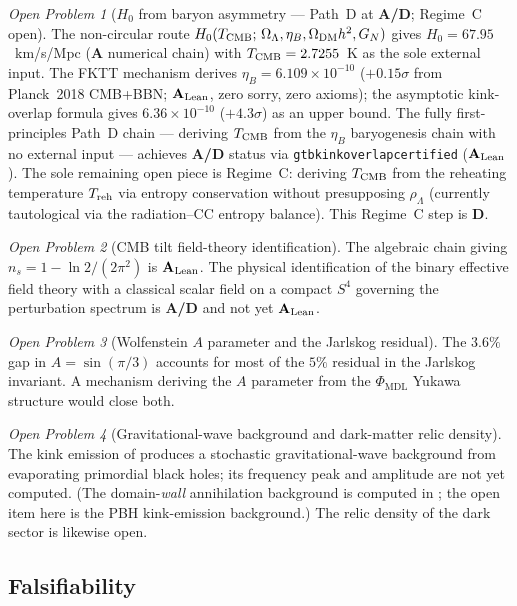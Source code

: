 \documentclass[11pt]{article}
\theoremstyle{remark}
\newtheorem{openprob}{Open Problem}
\newcommand{\PHIMDL}{\Phi_{\mathrm{MDL}}}
\newcommand{\lean}[1]{%
  \penalty-100
  \begingroup\def\_{\textunderscore\allowbreak}\texttt{#1}\endgroup}
\newcommand{\Hnought}{H_0}
\newcommand{\ns}{n_s}
\newcommand{\CatA}{\textbf{A}}
\newcommand{\CatAL}{\ensuremath{\textbf{A}_{\rm Lean}}}
\newcommand{\CatAD}{\textbf{A/D}}
\newcommand{\CatD}{\textbf{D}}
\begin{document}
\begin{openprob}[$\Hnought$ from baryon asymmetry --- Path~D at \CatAD{}; Regime~C open]
The non-circular route $H_0(T_{\rm CMB};\,\Omega_\Lambda, \eta_B, \Omega_{\rm DM}h^2, G_N)$
gives $H_0 = 67.95$~km/s/Mpc (\CatA{} numerical chain) with $T_{\rm CMB} = 2.7255$~K as
the sole external input. The FKTT mechanism derives $\eta_B = 6.109\times10^{-10}$
($+0.15\sigma$ from Planck~2018 CMB+BBN; \CatAL{}, zero sorry, zero axioms); the
asymptotic kink-overlap formula gives $6.36\times10^{-10}$ ($+4.3\sigma$) as an upper bound.
The fully first-principles Path~D chain --- deriving $T_{\rm CMB}$ from the $\eta_B$
baryogenesis chain with no external input --- achieves \CatAD{} status via
\lean{gtb\_kink\_overlap\_certified} (\CatAL{}).
The sole remaining open piece is Regime~C: deriving $T_{\rm CMB}$ from the reheating
temperature $T_{\rm reh}$ via entropy conservation without presupposing $\rho_\Lambda$
(currently tautological via the radiation--CC entropy balance). This Regime~C step
is \CatD{}.
\end{openprob}

\begin{openprob}[CMB tilt field-theory identification]
The algebraic chain giving $\ns = 1 - \ln2/(2\pi^2)$ is \CatAL. The physical
identification of the binary effective field theory with a classical scalar field on
a compact $S^4$ governing the perturbation spectrum is \CatAD{} and not yet \CatAL.
\end{openprob}

\begin{openprob}[Wolfenstein $A$ parameter and the Jarlskog residual]
The $3.6\%$ gap in $A = \sin(\pi/3)$ accounts for most of the $5\%$ residual in the
Jarlskog invariant. A mechanism deriving the $A$ parameter from the $\PHIMDL$ Yukawa
structure would close both.
\end{openprob}

\begin{openprob}[Gravitational-wave background and dark-matter relic density]
The kink emission of  produces a stochastic gravitational-wave
background from evaporating primordial black holes; its frequency peak and amplitude
are not yet computed. (The domain-\emph{wall} annihilation background is computed in
; the open item here is the PBH kink-emission background.) The
relic density of the dark sector is likewise open.
\end{openprob}

\subsection{Falsifiability}
\end{document}
